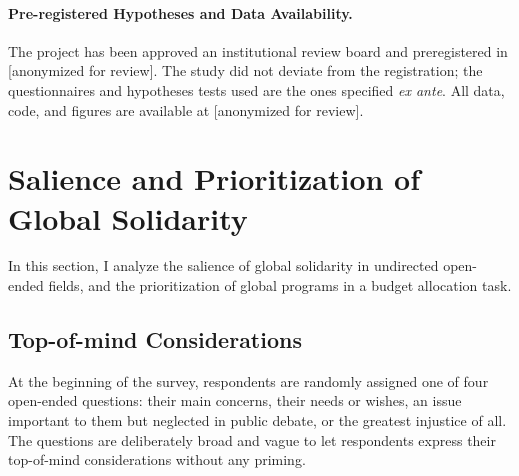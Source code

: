\documentclass[12pt,english]{article}
\begin{document}
\begin{bibunit}
\paragraph{Pre-registered Hypotheses and Data Availability.}
The project has been approved an %
institutional review board %
and preregistered in [anonymized for review]. 
The study did not deviate from the registration; the questionnaires and hypotheses tests used are the ones specified \textit{ex ante}. %
All data, code, and figures are available at [anonymized for review].%


\section{Salience and Prioritization of Global Solidarity\label{sec:salience}}

In this section, I analyze the salience of global solidarity in undirected open-ended fields, and the prioritization of global programs in a budget allocation task.

\subsection{Top-of-mind Considerations}\label{subsec:considerations}

At the beginning of the survey, respondents are randomly assigned one of four open-ended questions: their main concerns, their needs or wishes, an issue important to them but neglected in public debate, or the greatest injustice of all. The questions are deliberately broad and vague to let respondents express their top-of-mind considerations without any priming.


\end{bibunit}
\end{document}
